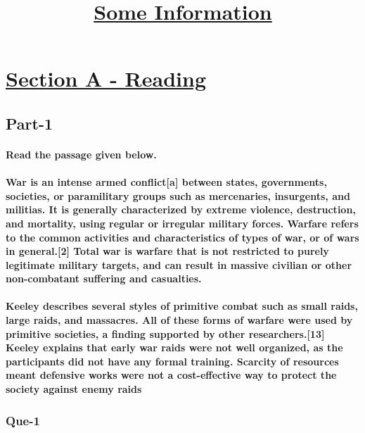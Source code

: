 \documentclass[12pt]{article}
\title{\huge{\underline{\textbf{Some Information}}}}
\begin{document}
\maketitle
\tableofcontents

\section{\underline{Section A - Reading}}


\subsection{Part-1}
\paragraph{Read the passage given below.}

\paragraph{War is an intense armed conflict[a] between states, governments, societies, or paramilitary groups such as mercenaries, insurgents, and militias. It is generally characterized by extreme violence, destruction, and mortality, using regular or irregular military forces. Warfare refers to the common activities and characteristics of types of war, or of wars in general.[2] Total war is warfare that is not restricted to purely legitimate military targets, and can result in massive civilian or other non-combatant suffering and casualties.}

\newpage


\paragraph{Keeley describes several styles of primitive combat such as small raids, large raids, and massacres. All of these forms of warfare were used by primitive societies, a finding supported by other researchers.[13] Keeley explains that early war raids were not well organized, as the participants did not have any formal training. Scarcity of resources meant defensive works were not a cost-effective way to protect the society against enemy raids}

\subsubsection{Que-1}
\end{document}
